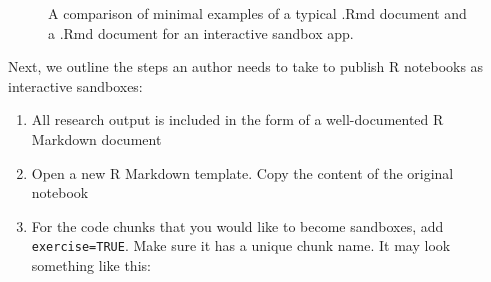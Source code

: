 \begin{Schunk}
\begin{figure}

{\centering {}

}

\caption[A comparison of minimal examples of a typical .Rmd document and a .Rmd document for an interactive sandbox app]{A comparison of minimal examples of a typical .Rmd document and a .Rmd document for an interactive sandbox app.}\label{fig:fig_skeleton}
\end{figure}
\end{Schunk}

Next, we outline the steps an author needs to take to publish R
notebooks as interactive sandboxes:

\begin{enumerate}
\def\labelenumi{\arabic{enumi}.}
\tightlist
\item
  All research output is included in the form of a well-documented R
  Markdown document
\item
  Open a new  R Markdown template. Copy the content of
  the original notebook
\item
  For the code chunks that you would like to become sandboxes, add
  \texttt{exercise=TRUE}. Make sure it has a unique chunk name. It may
  look something like this:
\end{enumerate}

